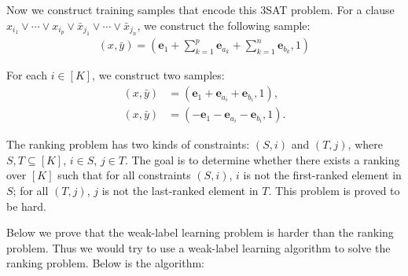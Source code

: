 \documentclass{article}
\newcommand{\e}{\mathbf{e}}
\begin{document}
Now we construct training samples that encode this 3SAT problem. For a clause $x_{i_1}\vee \cdots \vee x_{i_p} \vee \bar{x}_{j_1}\vee \cdots \vee \bar{x}_{j_n}$, we construct the following sample: 
\begin{align}
    (x,\bar{y}) = \left(\e_1 + \sum_{k=1}^p \e_{a_k} + \sum_{k=1}^n \e_{b_k}, 1 \right) \label{sample1}
\end{align}

For each $i\in [K]$, we construct two samples: 
\begin{align}
    (x,\bar{y}) &= \left( \e_1 + \e_{a_i} + \e_{b_i}, 1 \right), \\
    (x, \bar{y}) &= \left( -\e_1 - \e_{a_i} - \e_{b_i}, 1 \right). 
\end{align}



The ranking problem has two kinds of constraints: $(S,i)$ and $(T,j)$, where $S, T\subseteq [K]$, $i\in S$, $j\in T$. The goal is to determine whether there exists a ranking over $[K]$ such that for all constraints $(S,i)$, $i$ is not the first-ranked element in $S$; for all $(T,j)$, $j$ is not the last-ranked element in $T$. This problem is proved to be hard. 

Below we prove that the weak-label learning problem is harder than the ranking problem. Thus we would try to use a weak-label learning algorithm to solve the ranking problem. Below is the algorithm: 
\end{document}
